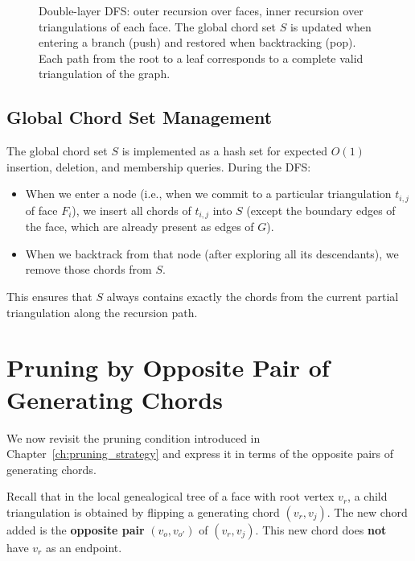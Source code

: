 \begin{figure}[htbp]
    \caption{Double-layer DFS: outer recursion over faces, inner recursion over triangulations of each face. 
    The global chord set \(S\) is updated when entering a branch (push) and restored when backtracking (pop). 
    Each path from the root to a leaf corresponds to a complete valid triangulation of the graph.}
    \label{fig:double_layer_dfs}
\end{figure}

\subsection{Global Chord Set Management}
\label{subsec:global_chord_set}

The global chord set \(S\) is implemented as a hash set for expected \(O(1)\) insertion, deletion, and membership queries. 
During the DFS:
\begin{itemize}
    \item When we enter a node (i.e., when we commit to a particular triangulation \(t_{i,j}\) of face \(F_i\)), we insert all chords of \(t_{i,j}\) into \(S\) (except the boundary edges of the face, which are already present as edges of \(G\)).
    \item When we backtrack from that node (after exploring all its descendants), we remove those chords from \(S\).
\end{itemize}
This ensures that \(S\) always contains exactly the chords from the current partial triangulation along the recursion path.

\section{Pruning by Opposite Pair of Generating Chords}
\label{sec:pruning_opposite}

We now revisit the pruning condition introduced in Chapter~\ref{ch:pruning_strategy} and express it in terms of the opposite pairs of generating chords.

Recall that in the local genealogical tree of a face with root vertex \(v_r\), a child triangulation is obtained by flipping a generating chord \((v_r, v_j)\). 
The new chord added is the \textbf{opposite pair} \((v_o, v_{o'})\) of \((v_r, v_j)\). 
This new chord does \textbf{not} have \(v_r\) as an endpoint.

